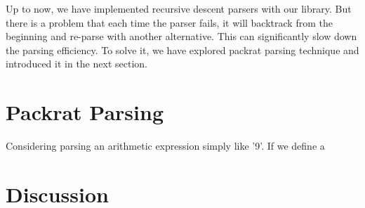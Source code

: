 Up to now, we have implemented recursive descent parsers with our library. But there is a problem that each time the parser fails, it will backtrack from the beginning and re-parse with another alternative. This can significantly slow down the parsing efficiency. To solve it, we have explored packrat parsing technique and introduced it in the next section.

\section{Packrat Parsing}
Considering parsing an arithmetic expression simply like '9'. If we define a 

\section{Discussion}